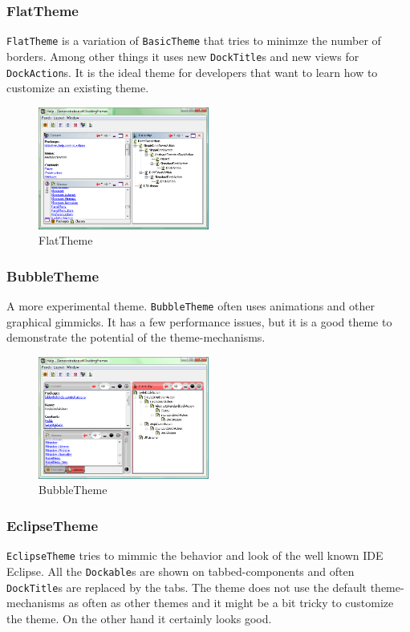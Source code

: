 \documentclass[a4paper,10pt]{article}
\newcommand{\src}[1]{\texttt{#1}}
\begin{document}
\subsubsection{FlatTheme}
\src{FlatTheme} is a variation of \src{BasicTheme} that tries to minimze the number of borders. Among other things it uses new \src{DockTitle}s and new views for \src{DockAction}s. It is the ideal theme for developers that want to learn how to customize an existing theme.

\begin{figure}[ht]
\centering
\includegraphics[width=0.5\textwidth]{theme_flat}
\caption{FlatTheme}
\label{fig:theme_basic}
\end{figure}

\subsubsection{BubbleTheme}
A more experimental theme. \src{BubbleTheme} often uses animations and other graphical gimmicks. It has a few performance issues, but it is a good theme to demonstrate the potential of the theme-mechanisms.

\begin{figure}[ht]
\centering
\includegraphics[width=0.5\textwidth]{theme_bubble}
\caption{BubbleTheme}
\label{fig:theme_bubble}
\end{figure}

\subsubsection{EclipseTheme}
\src{EclipseTheme} tries to mimmic the behavior and look of the well known IDE Eclipse. All the \src{Dockable}s are shown on tabbed-components and often \linebreak \src{DockTitle}s are replaced by the tabs. The theme does not use the default theme-mechanisms as often as other themes and it might be a bit tricky to customize the theme. On the other hand it certainly looks good.
\end{document}

